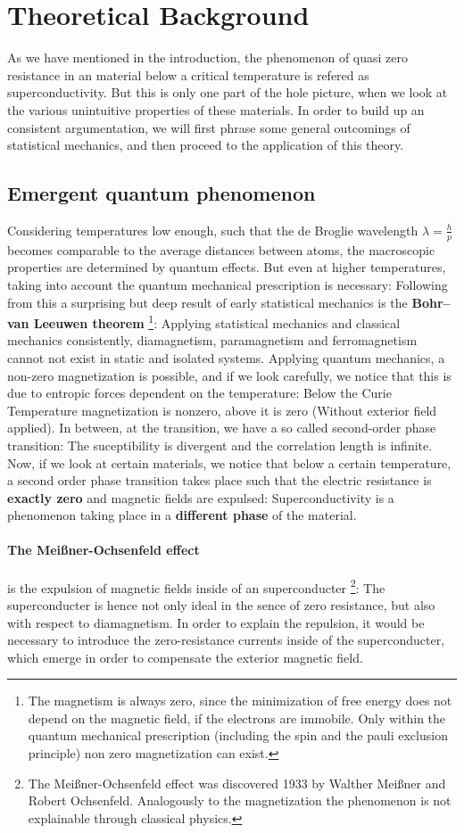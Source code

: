 \section{Theoretical Background}
\label{sec:theory}
As we have mentioned in the introduction, the phenomenon of quasi zero
resistance in an material below a critical temperature is refered as superconductivity.
But this is only one part of the hole picture, when we look at the various
unintuitive properties of these materials. In order to build up an consistent argumentation,
we will first phrase some general outcomings of statistical mechanics, and then proceed to the
application of this theory.
\subsection{Emergent quantum phenomenon}
Considering temperatures low enough, such that the de Broglie wavelength $\lambda = \frac{h}{p}$ becomes comparable to the
average distances between atoms, the macroscopic properties are determined by quantum effects.
But even at higher temperatures, taking into account the quantum mechanical prescription is necessary:
Following from this a surprising but deep result of early statistical mechanics is the \textbf{Bohr–van Leeuwen theorem}
\footnote{The magnetism is always zero, since the minimization of free energy does not depend
on the magnetic field, if the electrons are immobile. Only within the quantum mechanical prescription (including the spin and the
pauli exclusion principle) non zero magnetization can exist.}:
Applying statistical mechanics and classical mechanics consistently, diamagnetism, paramagnetism and ferromagnetism
cannot not exist in static and isolated systems. Applying quantum mechanics, a non-zero magnetization 
is possible, and if we look carefully, we notice that this is due to entropic forces
dependent on the temperature: Below the Curie Temperature magnetization is nonzero, above it is zero
(Without exterior field applied). In between, at the transition, we have a so called second-order phase
transition: The suceptibility is divergent and the correlation length is infinite. Now, if we look
at certain materials, we notice that below a certain temperature, a second order phase transition takes
place such that the electric resistance is \textbf{exactly zero} and magnetic fields are expulsed: 
Superconductivity is a phenomenon taking place in a \textbf{different phase} of the material.
\paragraph{The Meißner-Ochsenfeld effect} is the expulsion of magnetic fields inside of an superconducter
\footnote{The Meißner-Ochsenfeld effect was discovered 1933 by Walther Meißner and Robert Ochsenfeld. Analogously to the
magnetization the phenomenon is not explainable through classical physics.}:
The superconducter is hence not only ideal in the sence of zero resistance, but also with respect
to diamagnetism. In order to explain the repulsion, it would be necessary to introduce the zero-resistance
currents inside of the superconducter, which emerge in order to compensate the exterior magnetic field.
